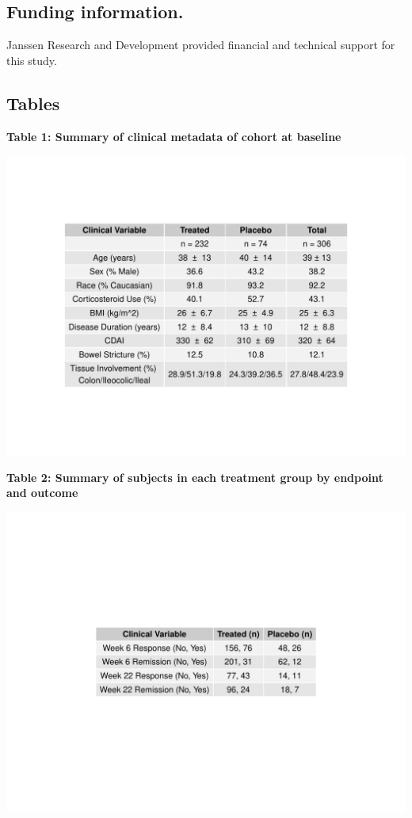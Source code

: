 \documentclass[12pt,]{article}
\begin{document}
\subsection{Funding information.}\label{funding-information.}

Janssen Research and Development provided financial and technical
support for this study.

\newpage

\subsection{Tables}\label{tables}

\textbf{Table 1: Summary of clinical metadata of cohort at baseline}

\includegraphics{tables/Table1_baseline_metadata.pdf}

\newpage

\textbf{Table 2: Summary of subjects in each treatment group by endpoint
and outcome}

\includegraphics{tables/table2_resposne_treatN.pdf}
\end{document}
